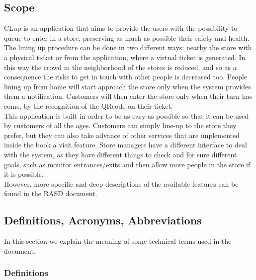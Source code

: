 \documentclass[]{article}
\begin{document}
	\bigskip
	\bigskip
	
	\subsection{Scope}
	
		\noindent
		CLup is an application that aims to provide the users with the possibility to queue to enter in a store, preserving as much as possible their safety and health. The lining up procedure can be done in two different ways: nearby the store with a physical ticket or from the application, where a virtual ticket is generated. In this way the crowd in the neighborhood of the stores is reduced, and so as a consequence the risks to get in touch with other people is decreased too. People lining up from home will start approach the store only when the system provides them a notification. Customers will then enter the store only when their turn has come, by the recognition of the QRcode on their ticket.\\
		This application is built in order to be as easy as possible so that it can be used by customers of all the ages. Customers can simply line-up to the store they prefer, but they can also take advance of other services that are implemented inside the book a visit feature. Store managers have a different interface to deal with the system, as they have different things to check and for sure different goals, such as monitor entrances/exits and then allow more people in the store if it is possible. \\
		However, more specific and deep descriptions of the available features can be found in the RASD document.\\
		
	\newpage
	\subsection{Definitions, Acronyms, Abbreviations}
	
		In this section we explain the meaning of some technical terms used in the document.
		
		
		\subsubsection{Definitions}
		
			\medskip
			
\end{document}
